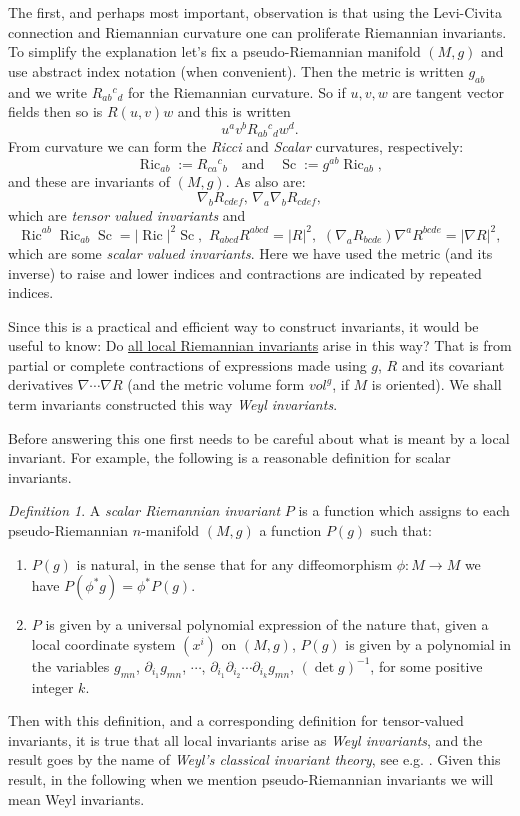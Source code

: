 \documentclass[a4paper,12pt]{amsart}
\theoremstyle{remark}
\newcommand{\Ric}{\operatorname{Ric}}
\newcommand{\Sc}{\operatorname{Sc}}
\newtheorem{definition}{Definition}
\begin{document}
The first, and perhaps most important, observation is that using the Levi-Civita connection and Riemannian curvature one can proliferate Riemannian invariants. To simplify the explanation let's fix a pseudo-Riemannian manifold $(M,g)$ and use abstract index notation
(when convenient). Then the metric is written $g_{ab}$ and we write
$R_{ab}{}^c{}_d$ for the Riemannian curvature. So if $u,v,w$ are
tangent vector fields then so is $R(u,v)w$ and this is written
$$
u^av^b R_{ab}{}^c{}_d w^d.
$$ 
From curvature we can form the {\em Ricci} and {\em Scalar}
curvatures, respectively:
$$
\Ric_{ab}:=R_{ca}{}^c{}_b \quad \mbox{and}\quad \Sc:=g^{ab}\Ric_{ab},
$$
and these are invariants of $(M,g)$. As also are:
$$
\nabla_b R_{cdef}, \,  \nabla_a\nabla_b R_{cdef}, 
$$
which are {\em tensor valued invariants} and 
$$
\Ric^{ab}\Ric_{ab}\Sc= \vert \Ric \vert^2\Sc, \, \, R_{abcd}R^{abcd}=\vert R\vert^2, \, \, (\nabla_a R_{bcde})\nabla^a R^{bcde}=\vert \nabla R\vert^2,
$$ 
which are some {\em scalar valued invariants}. Here we have used
the metric (and its inverse) to raise and lower indices and
contractions are indicated by repeated indices.

Since this is a practical and efficient way to construct invariants,
it would be useful to know: Do \underline{all local Riemannian
  invariants} arise in this way? That is from partial or complete
contractions of expressions made using $g$, $ R$ and its covariant
derivatives $\nabla\cdots \nabla R$ (and the metric volume form
$vol^g$, if $M$ is oriented). We shall term invariants constructed
this way {\em Weyl invariants}.

Before answering this one first needs to be careful about what is
meant by a local invariant. For example, the following is a reasonable
definition for scalar invariants.
\begin{definition}\label{R-invtdef}
A {\em scalar Riemannian invariant} 
$P$ is a function which assigns to each pseudo-Riemannian $n$-manifold
$(M,g)$  a function
$P(g)$ such that:
\begin{enumerate}
\item[(i)] $P(g)$ is natural, in the sense that
for any diffeomorphism $\phi:M\to M$ we have $P(\phi^* g ) =
\phi^* P(g) $.
\item[(ii)] $P$ is given by a universal polynomial expression of the
  nature that, given a local coordinate system $(x^i)$ on $(M,g)$,
  $P(g)$ is given by a polynomial in the variables $g_{mn}$,
  $\partial_{i_1}g_{mn}$, $\cdots$,
  $\partial_{i_1}\partial_{i_2}\cdots \partial_{i_k} g_{mn}$, $(\det
  g)^{-1}$,  for some positive
  integer $k$.
\end{enumerate}
\end{definition}
Then with this definition, and a corresponding definition for
tensor-valued invariants, it is true that all local invariants arise
as {\em Weyl invariants}, and the result goes by the name of {\em
Weyl's classical invariant theory}, see e.g. \cite{AtiyahBP,Stredder}. Given this result, in the following when we mention pseudo-Riemannian invariants we will mean Weyl invariants.
\end{document}
